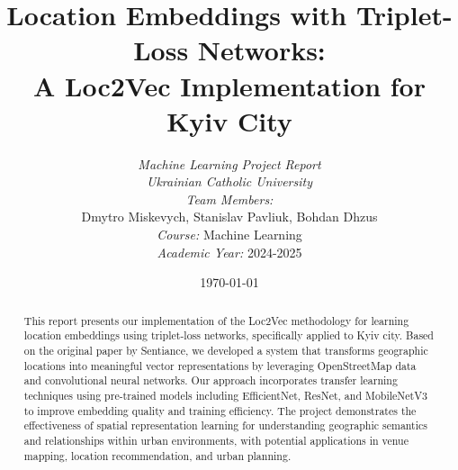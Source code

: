 \documentclass[12pt,a4paper]{article}
\title{
    \textbf{Location Embeddings with Triplet-Loss Networks: \\
    A Loc2Vec Implementation for Kyiv City}
}
\author{
    \textit{Machine Learning Project Report} \\
    \textit{Ukrainian Catholic University} \\
    \vspace{0.5cm}
    \textit{Team Members:} \\
    Dmytro Miskevych, Stanislav Pavliuk, Bohdan Dhzus \\
    \vspace{0.3cm}
    \textit{Course:} Machine Learning \\
    \textit{Academic Year:} 2024-2025
}
\date{\today}
\begin{document}
\maketitle

\begin{abstract}
This report presents our implementation of the Loc2Vec methodology for learning location embeddings using triplet-loss networks, specifically applied to Kyiv city. Based on the original paper by Sentiance, we developed a system that transforms geographic locations into meaningful vector representations by leveraging OpenStreetMap data and convolutional neural networks. Our approach incorporates transfer learning techniques using pre-trained models including EfficientNet, ResNet, and MobileNetV3 to improve embedding quality and training efficiency. The project demonstrates the effectiveness of spatial representation learning for understanding geographic semantics and relationships within urban environments, with potential applications in venue mapping, location recommendation, and urban planning.
\end{abstract}

\tableofcontents
\newpage








\newpage


\end{document}
